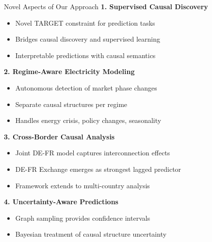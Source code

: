 \documentclass[aspectratio=169]{beamer}
\begin{document}
\begin{frame}{Novel Aspects of Our Approach}
\textbf{1. Supervised Causal Discovery}
\begin{itemize}
    \item Novel TARGET constraint for prediction tasks
    \item Bridges causal discovery and supervised learning
    \item Interpretable predictions with causal semantics
\end{itemize}

\textbf{2. Regime-Aware Electricity Modeling}
\begin{itemize}
    \item Autonomous detection of market phase changes
    \item Separate causal structures per regime
    \item Handles energy crisis, policy changes, seasonality
\end{itemize}

\textbf{3. Cross-Border Causal Analysis}
\begin{itemize}
    \item Joint DE-FR model captures interconnection effects
    \item DE-FR Exchange emerges as strongest lagged predictor
    \item Framework extends to multi-country analysis
\end{itemize}

\textbf{4. Uncertainty-Aware Predictions}
\begin{itemize}
    \item Graph sampling provides confidence intervals
    \item Bayesian treatment of causal structure uncertainty
\end{itemize}
\end{frame}
\end{document}
